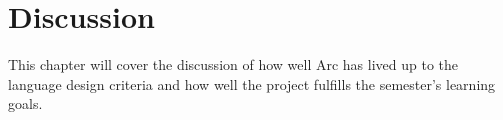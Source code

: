 \chapter{Discussion}\label{cha:discussion}

This chapter will cover the discussion of how well Arc has lived up to the language design criteria and how well the project fulfills the semester's learning goals.



